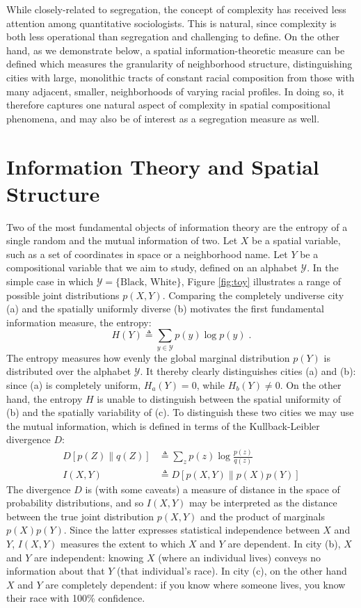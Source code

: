 \documentclass[english]{scrartcl}
\begin{document}
	While closely-related to segregation, the concept of complexity has received less attention among quantitative sociologists. This is natural, since complexity is both less operational than segregation and challenging to define. On the other hand, as we demonstrate below, a spatial information-theoretic measure can be defined which measures the granularity of neighborhood structure, distinguishing cities with large, monolithic tracts of constant racial composition from those with many adjacent, smaller, neighborhoods of varying racial profiles. In doing so, it therefore captures one natural aspect of complexity in spatial compositional phenomena, and may also be of interest as a segregation measure as well. 

\section{Information Theory and Spatial Structure}

	Two of the most fundamental objects of information theory are the entropy of a single random and the mutual information of two. Let $X$ be a spatial variable, such as a set of coordinates in space or a neighborhood name. Let $Y$ be a compositional variable that we aim to study, defined on an alphabet $\mathcal{Y}$. In the simple case in which $\mathcal{Y}  = \{\text{Black, White}\}$, Figure \ref{fig:toy} illustrates a range of possible joint distributions $p(X,Y)$. Comparing the completely undiverse city (a) and the spatially uniformly diverse (b) motivates the first fundamental information measure, the entropy:
	\begin{equation}
		H(Y) \triangleq \sum_{y \in \mathcal{Y}} p(y) \log p(y)\;.
	\end{equation}
	The entropy measures how evenly the global marginal distribution $p(Y)$ is distributed over the alphabet $\mathcal{Y}$. It thereby clearly distinguishes cities (a) and (b): since (a) is completely uniform, $H_a(Y) = 0$, while $H_b(Y) \neq 0$. On the other hand, the entropy $H$ is unable to distinguish between the spatial uniformity of (b) and the spatially variability of (c). To distinguish these two cities we may use the mutual information, which is defined in terms of the Kullback-Leibler divergence $D$:
	\begin{align}
		D[p(Z)\|q(Z)] &\triangleq \sum_z p(z) \log \frac{p(z)}{q(z)} \\
		I(X,Y) &\triangleq D[p(X,Y) \| p(X)p(Y)]
	\end{align}
	The divergence $D$ is (with some caveats) a measure of distance in the space of probability distributions, and so $I(X,Y)$ may be interpreted as the distance between the true joint distribution $p(X,Y)$ and the product of marginals $p(X)p(Y)$. Since the latter expresses statistical independence between $X$ and $Y$, $I(X,Y)$ measures the extent to which $X$ and $Y$ are dependent. In city (b), $X$ and $Y$ are independent: knowing $X$ (where an individual lives) conveys no information about that $Y$ (that individual's race).  In city (c), on the other hand $X$ and $Y$ are completely dependent: if you know where someone lives, you know their race with 100\% confidence. 
\end{document}
